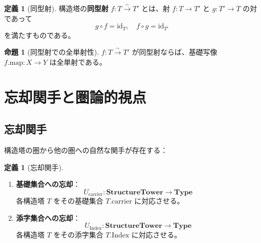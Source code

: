 \documentclass[a4paper,12pt]{ltjsarticle}
\theoremstyle{definition}
\newtheorem{proposition}[theorem]{命題}
\newtheorem{definition}[theorem]{定義}
\newcommand{\cat}[1]{\mathbf{#1}}
\newcommand{\id}{\mathrm{id}}
\begin{document}
\begin{definition}[同型射]
構造塔の\textbf{同型射} $f : T \xrightarrow{\sim} T'$ とは、射 $f : T \to T'$ と $g : T' \to T$ の対であって
\[
g \circ f = \id_T, \quad f \circ g = \id_{T'}
\]
を満たすものである。
\end{definition}

\begin{proposition}[同型射での全単射性]
$f : T \xrightarrow{\sim} T'$ が同型射ならば、基礎写像 $f.\mathrm{map} : X \to Y$ は全単射である。
\end{proposition}

\section{忘却関手と圏論的視点}

\subsection{忘却関手}

構造塔の圏から他の圏への自然な関手が存在する：

\begin{definition}[忘却関手]
\begin{enumerate}
\item \textbf{基礎集合への忘却}：
\[
U_{\mathrm{carrier}} : \cat{StructureTower} \to \cat{Type}
\]
各構造塔 $T$ をその基礎集合 $T.\mathrm{carrier}$ に対応させる。

\item \textbf{添字集合への忘却}：
\[
U_{\mathrm{Index}} : \cat{StructureTower} \to \cat{Type}
\]
各構造塔 $T$ をその添字集合 $T.\mathrm{Index}$ に対応させる。
\end{enumerate}
\end{definition}

\begin{center}
\end{center}
\end{document}
